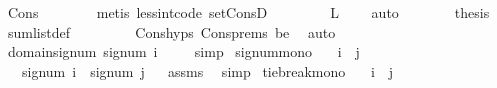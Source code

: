 \begin{isabellebody}
\ Cons\isanewline
\ \ \ \ \ \ \isamarkupfalse%
\ {\isacharparenleft}{\kern0pt}metis\ less{\isacharunderscore}{\kern0pt}int{\isacharunderscore}{\kern0pt}code{\isacharparenleft}{\kern0pt}{}{\isacharparenright}{\kern0pt}\ set{\isacharunderscore}{\kern0pt}ConsD{\isacharparenright}{\kern0pt}\ \isanewline
\ \ \ \ \isamarkupfalse%
\ \isamarkupfalse%
\ {\isachardoublequoteopen}L\ {\isasymnoteq}\ {\isacharbrackleft}{\kern0pt}{\isacharbrackright}{\kern0pt}{\isachardoublequoteclose}\ \isamarkupfalse%
\ auto\isanewline
\ \ \ \ \isamarkupfalse%
\ \isamarkupfalse%
\ {\isacharquery}{\kern0pt}thesis\ \isamarkupfalse%
\ sum{\isacharunderscore}{\kern0pt}list{\isacharunderscore}{\kern0pt}def\ {}\isanewline
\ \ \ \ \ \ \isamarkupfalse%
\ Cons{\isachardot}{\kern0pt}hyps\ Cons{\isachardot}{\kern0pt}prems{\isacharparenleft}{\kern0pt}{}{\isacharparenright}{\kern0pt}\ be\ \isamarkupfalse%
\ auto\isanewline
\ \ \isamarkupfalse%
\isanewline
{}\isamarkupfalse%
%
\endisatagproof
{\isafoldproof}%
%
\isadelimproof
\isanewline
%
\endisadelimproof
\isanewline
{}\isamarkupfalse%
\ domain{\isacharunderscore}{\kern0pt}signum{\isacharcolon}{\kern0pt}\ {\isachardoublequoteopen}signum\ i\ {\isasymin}\ {\isacharbraceleft}{\kern0pt}{\isacharminus}{\kern0pt}{}{\isacharcomma}{\kern0pt}{}{\isacharcomma}{\kern0pt}{}{\isacharbraceright}{\kern0pt}{\isachardoublequoteclose}%
\isadelimproof
\ %
\endisadelimproof
%
\isatagproof
{}\isamarkupfalse%
\ simp%
\endisatagproof
{\isafoldproof}%
%
\isadelimproof
%
\endisadelimproof
\isanewline
\isanewline
{}\isamarkupfalse%
\ signum{\isacharunderscore}{\kern0pt}mono{\isacharcolon}{\kern0pt}\isanewline
\ \ \ {\isachardoublequoteopen}i\ {\isasymle}\ j{\isachardoublequoteclose}\isanewline
\ \ \ {\isachardoublequoteopen}signum\ i\ {\isasymle}\ signum\ j{\isachardoublequoteclose}%
\isadelimproof
\ %
\endisadelimproof
%
\isatagproof
{}\isamarkupfalse%
\ assms\ \isamarkupfalse%
\ simp%
\endisatagproof
{\isafoldproof}%
%
\isadelimproof
%
\endisadelimproof
\isanewline
\isanewline
{}\isamarkupfalse%
\ tie{\isacharunderscore}{\kern0pt}break{\isacharunderscore}{\kern0pt}mono{\isacharcolon}{\kern0pt}\isanewline
\ \ \ {\isachardoublequoteopen}i\ {\isasymle}\ j{\isachardoublequoteclose}\isanewline

\end{isabellebody}
